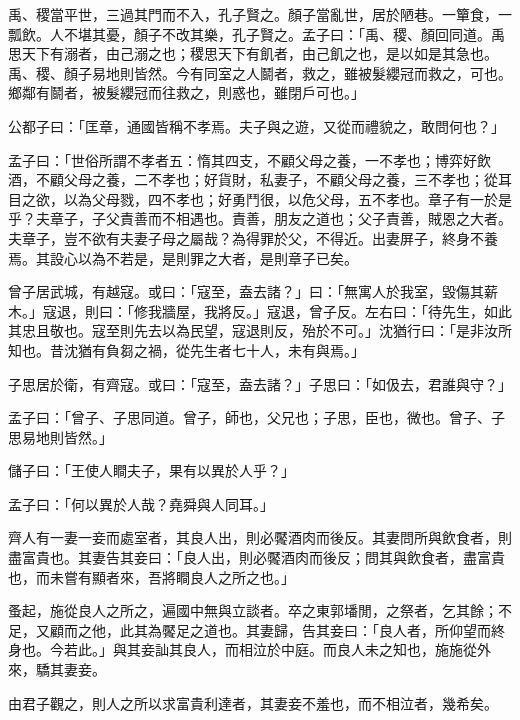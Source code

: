 \begin{pinyinscope}
禹、稷當平世，三過其門而不入，孔子賢之。顏子當亂世，居於陋巷。一簞食，一瓢飲。人不堪其憂，顏子不改其樂，孔子賢之。孟子曰：「禹、稷、顏回同道。禹思天下有溺者，由己溺之也；稷思天下有飢者，由己飢之也，是以如是其急也。禹、稷、顏子易地則皆然。今有同室之人鬬者，救之，雖被髮纓冠而救之，可也。鄉鄰有鬬者，被髮纓冠而往救之，則惑也，雖閉戶可也。」

公都子曰：「匡章，通國皆稱不孝焉。夫子與之遊，又從而禮貌之，敢問何也？」

孟子曰：「世俗所謂不孝者五：惰其四支，不顧父母之養，一不孝也；博弈好飲酒，不顧父母之養，二不孝也；好貨財，私妻子，不顧父母之養，三不孝也；從耳目之欲，以為父母戮，四不孝也；好勇鬥很，以危父母，五不孝也。章子有一於是乎？夫章子，子父責善而不相遇也。責善，朋友之道也；父子責善，賊恩之大者。夫章子，豈不欲有夫妻子母之屬哉？為得罪於父，不得近。出妻屏子，終身不養焉。其設心以為不若是，是則罪之大者，是則章子已矣。

曾子居武城，有越寇。或曰：「寇至，盍去諸？」曰：「無寓人於我室，毀傷其薪木。」寇退，則曰：「修我牆屋，我將反。」寇退，曾子反。左右曰：「待先生，如此其忠且敬也。寇至則先去以為民望，寇退則反，殆於不可。」沈猶行曰：「是非汝所知也。昔沈猶有負芻之禍，從先生者七十人，未有與焉。」

子思居於衛，有齊寇。或曰：「寇至，盍去諸？」子思曰：「如伋去，君誰與守？」

孟子曰：「曾子、子思同道。曾子，師也，父兄也；子思，臣也，微也。曾子、子思易地則皆然。」

儲子曰：「王使人瞷夫子，果有以異於人乎？」

孟子曰：「何以異於人哉？堯舜與人同耳。」

齊人有一妻一妾而處室者，其良人出，則必饜酒肉而後反。其妻問所與飲食者，則盡富貴也。其妻告其妾曰：「良人出，則必饜酒肉而後反；問其與飲食者，盡富貴也，而未嘗有顯者來，吾將瞷良人之所之也。」

蚤起，施從良人之所之，遍國中無與立談者。卒之東郭墦閒，之祭者，乞其餘；不足，又顧而之他，此其為饜足之道也。其妻歸，告其妾曰：「良人者，所仰望而終身也。今若此。」與其妾訕其良人，而相泣於中庭。而良人未之知也，施施從外來，驕其妻妾。

由君子觀之，則人之所以求富貴利達者，其妻妾不羞也，而不相泣者，幾希矣。


\end{pinyinscope}